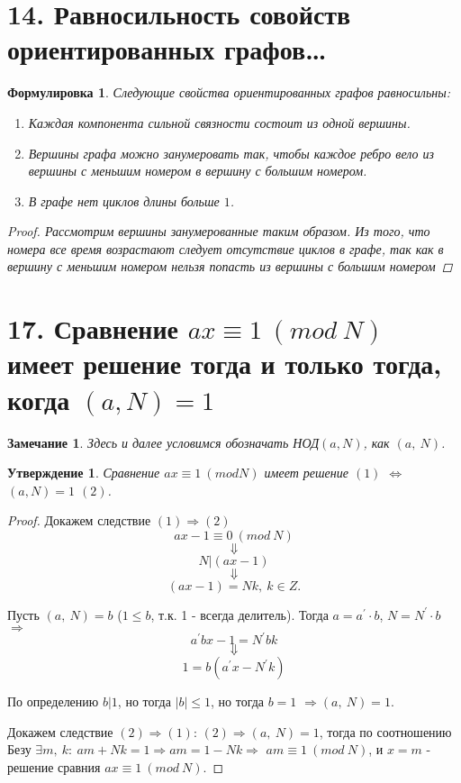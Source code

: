 \documentclass[a4paper,12pt]{article}
\newtheorem*{Note}{Замечание}
\newtheorem*{state}{Утверждение}
\newtheorem*{statement}{Формулировка}
\newcommand{\p}{^{\prime}}
\begin{document}
    \section*{14. Равносильность совойств ориентированных графов\ldots}
    \begin{statement}
        Следующие свойства ориентированных графов равносильны:
        \begin{enumerate}
            \item Каждая компонента сильной связности состоит из одной вершины.
            \item Вершины графа можно занумеровать так, чтобы каждое ребро вело из вершины с меньшим номером в вершину с большим номером.
            \item В графе нет циклов длины больше $1$.
        \end{enumerate}
        \begin{proof}
            Рассмотрим вершины занумерованные таким образом. Из того, что номера все время возрастают следует отсутствие циклов в графе, так как в вершину с меньшим номером нельзя попасть из вершины с большим номером
        \end{proof}
    \end{statement}
        

	\section*{17. Сравнение $ax \equiv 1\ (mod\ N)$ имеет решение тогда и только тогда, когда $(a, N) = 1$}
		\begin{Note} Здесь и далее условимся обозначать НОД$(a, N)$, как $(a,\ N)$.
		\end{Note}
		\begin{state}
		Сравнение $ax \equiv 1\ (mod N)$ имеет решение $(1)$ $\Leftrightarrow$ $(a, N) = 1$ $(2)$. 
		\end{state}
		\begin{proof}
		Докажем следствие $(1) \Rightarrow (2)$
		$$ax - 1\equiv 0\ (mod\ N)$$ 
		$$\Downarrow$$ 
		$$N | (ax - 1)$$
		$$\Downarrow$$ 
		$$(ax - 1) = Nk,\ k \in Z.$$

		Пусть $(a,\ N) = b$ ($1 \leqslant b$, т.к. 1 - всегда делитель).
		Тогда $a = a\p \cdot b$, $N = N\p \cdot b$ $\Rightarrow$
		$$a\p bx - 1 = N\p bk$$
		$$\Downarrow$$
		$$1 = b(a\p x - N\p k)$$

		По определению $b|1$, но тогда $|b| \leqslant 1$, но тогда $b = 1$ $\Rightarrow$$(a,\ N) = 1$.

		Докажем следствие $(2) \Rightarrow (1)$: $(2) \Rightarrow (a,\ N) = 1$, тогда по соотношению Безу $\exists m,\ k:\ am + Nk = 1 \Rightarrow am = 1 - Nk \Rightarrow$ $am \equiv 1\ (mod\ N)$, и $x=m$ - решение сравния $ax \equiv 1\ (mod\ N)$.  
		\end{proof}
\end{document}
